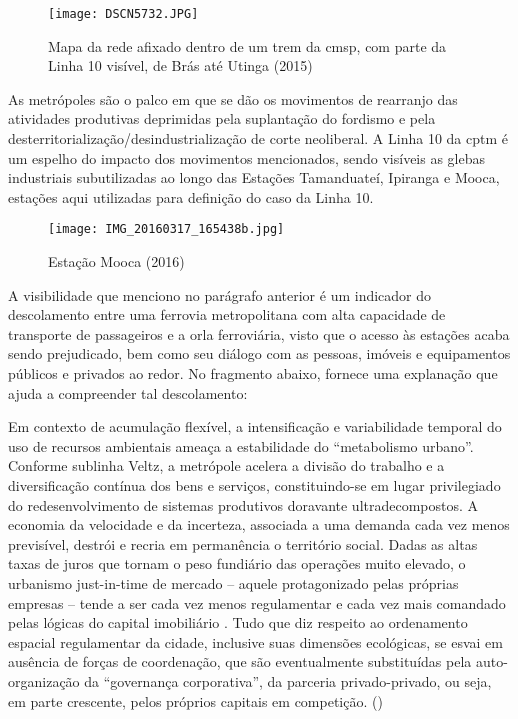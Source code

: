 \documentclass[11pt,fleqn]{book} %
\begin{document}
\begin{figure}[h]
	\caption{Mapa da rede afixado dentro de um trem da \gls{cmsp}, com parte da Linha 10 visível, de Brás até Utinga (2015)}
	\texttt{[image: DSCN5732.JPG]}
\end{figure}

As metrópoles são o palco em que se dão os movimentos de rearranjo das atividades produtivas deprimidas pela suplantação do fordismo e pela desterritorialização/desindustrialização de corte neoliberal\cite{Acselrad}. A Linha 10 da \gls{cptm} é um espelho do impacto dos movimentos mencionados, sendo visíveis as glebas industriais subutilizadas ao longo das Estações Tamanduateí, Ipiranga e Mooca, estações aqui utilizadas para definição do caso da Linha 10.

\begin{figure}[h]
	\caption{Estação Mooca (2016)}
	\texttt{[image: IMG\_20160317\_165438b.jpg]}
\end{figure}

A visibilidade que menciono no parágrafo anterior é um indicador do descolamento entre uma ferrovia metropolitana com alta capacidade de transporte de passageiros e a orla ferroviária, visto que o acesso às estações acaba sendo prejudicado, bem como seu diálogo com as pessoas, imóveis e equipamentos públicos e privados ao redor. No fragmento abaixo, \cite{Acselrad} fornece uma explanação que ajuda a compreender tal descolamento:

\begin{citacao}
	Em contexto de acumulação flexível, a intensificação e variabilidade temporal do uso de recursos ambientais ameaça a estabilidade do “metabolismo urbano”. Conforme sublinha Veltz, a metrópole acelera a divisão do trabalho e a diversificação contínua dos bens e serviços, constituindo-se em lugar privilegiado do redesenvolvimento de sistemas produtivos doravante ultradecompostos. A economia da velocidade e da incerteza, associada a uma demanda cada vez menos previsível, destrói e recria em permanência o território social. Dadas as altas taxas de juros que tornam o peso fundiário das operações muito elevado, o urbanismo just-in-time de mercado – aquele protagonizado pelas próprias empresas – tende a ser cada vez menos regulamentar e cada vez mais comandado pelas	lógicas do capital imobiliário \cite{Acselrad}. Tudo que diz respeito ao ordenamento espacial regulamentar da cidade, inclusive suas dimensões ecológicas, se esvai em ausência de forças de coordenação, que são eventualmente substituídas pela auto-organização da	“governança corporativa”, da parceria privado-privado, ou seja, em parte crescente, pelos próprios capitais em competição.
	(\cite[pág. 31]{Acselrad})
\end{citacao}
\end{document}
